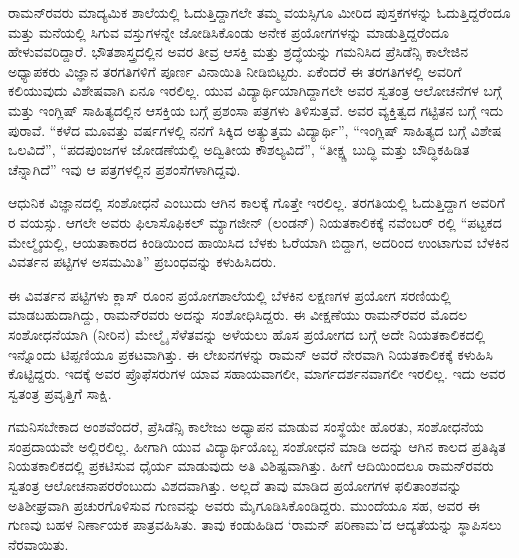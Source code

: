ರಾಮನ್‍ರವರು ಮಾದ್ಯಮಿಕ ಶಾಲೆಯಲ್ಲಿ ಓದುತ್ತಿದ್ದಾಗಲೇ ತಮ್ಮ ವಯಸ್ಸಿಗೂ ಮೀರಿದ ಪುಸ್ತಕಗಳನ್ನು ಓದುತ್ತಿದ್ದರೆಂದೂ ಮತ್ತು ಮನೆಯಲ್ಲಿ ಸಿಗುವ ವಸ್ತುಗಳನ್ನೇ ಜೋಡಿಸಿಕೊಂಡು ಅನೇಕ ಪ್ರಯೋಗಗಳನ್ನು ಮಾಡುತ್ತಿದ್ದರೆಂದೂ ಹೇಳುವವರಿದ್ದಾರೆ. ಭೌತಶಾಸ್ತ್ರದಲ್ಲಿನ ಅವರ ತೀವ್ರ ಆಸಕ್ತಿ ಮತ್ತು ಶ್ರದ್ಧೆಯನ್ನು ಗಮನಿಸಿದ ಪ್ರೆಸಿಡೆನ್ಸಿ ಕಾಲೇಜಿನ ಅಧ್ಯಾಪಕರು ವಿಜ್ಞಾನ ತರಗತಿಗಳಿಗೆ ಪೂರ್ಣ ವಿನಾಯಿತಿ ನೀಡಿಬಿಟ್ಟರು. ಏಕೆಂದರೆ ಈ ತರಗತಿಗಳಲ್ಲಿ ಅವರಿಗೆ ಕಲಿಯುವುದು ವಿಶೇಷವಾಗಿ ಏನೂ ಇರಲಿಲ್ಲ. ಯುವ ವಿದ್ಯಾರ್ಥಿಯಾಗಿದ್ದಾಗಲೇ ಅವರ ಸ್ವತಂತ್ರ ಆಲೋಚನೆಗಳ ಬಗ್ಗೆ ಮತ್ತು ಇಂಗ್ಲಿಷ್ ಸಾಹಿತ್ಯದಲ್ಲಿನ ಆಸಕ್ತಿಯ ಬಗ್ಗೆ ಪ್ರಶಂಸಾ ಪತ್ರಗಳು ತಿಳಿಸುತ್ತವೆ. ಅವರ ವ್ಯಕ್ತಿತ್ವದ ಗಟ್ಟಿತನ ಬಗ್ಗೆ ಇದು ಪುರಾವೆ. “ಕಳೆದ ಮೂವತ್ತು ವರ್ಷಗಳಲ್ಲಿ ನನಗೆ ಸಿಕ್ಕಿದ ಅತ್ಯುತ್ತಮ ವಿದ್ಯಾರ್ಥಿ”, “ಇಂಗ್ಲಿಷ್ ಸಾಹಿತ್ಯದ ಬಗ್ಗೆ ವಿಶೇಷ ಒಲವಿದೆ”, “ಪದಪುಂಜಗಳ ಜೋಡಣೆಯಲ್ಲಿ ಅದ್ವಿತೀಯ ಕೌಶಲ್ಯವಿದೆ”, “ತೀಕ್ಷ್ಣ ಬುದ್ಧಿ ಮತ್ತು ಬೌದ್ಧಿಕಹಿಡಿತ ಚೆನ್ನಾಗಿದೆ”  ಇವು ಆ ಪತ್ರಗಳಲ್ಲಿನ ಪ್ರಶಂಸೆಗಳಾಗಿದ್ದವು.

ಆಧುನಿಕ ವಿಜ್ಞಾನದಲ್ಲಿ ಸಂಶೋಧನೆ ಎಂಬುದು ಆಗಿನ ಕಾಲಕ್ಕೆ ಗೊತ್ತೇ ಇರಲಿಲ್ಲ.  ತರಗತಿಯಲ್ಲಿ ಓದುತ್ತಿದ್ದಾಗ ಅವರಿಗೆ ರ ವಯಸ್ಸು. ಆಗಲೇ ಅವರು ಫಿಲಾಸೊಫಿಕಲ್ ಮ್ಯಾಗಜೀನ್ (ಲಂಡನ್) ನಿಯತಕಾಲಿಕಕ್ಕೆ ನವೆಂಬರ್ ರಲ್ಲಿ “ಪಟ್ಟಕದ ಮೇಲ್ಮೈಯಲ್ಲಿ, ಆಯತಾಕಾರದ ಕಿಂಡಿಯಿಂದ ಹಾಯಿಸಿದ ಬೆಳಕು ಓರೆಯಾಗಿ ಬಿದ್ದಾಗ, ಅದರಿಂದ ಉಂಟಾಗುವ ಬೆಳಕಿನ ವಿವರ್ತನ ಪಟ್ಟಿಗಳ ಅಸಮಮಿತಿ”  ಪ್ರಬಂಧವನ್ನು ಕಳುಹಿಸಿದರು.

ಈ ವಿವರ್ತನ ಪಟ್ಟಿಗಳು ಕ್ಲಾಸ್ ರೂಂನ ಪ್ರಯೋಗಶಾಲೆಯಲ್ಲಿ ಬೆಳಕಿನ ಲಕ್ಷಣಗಳ ಪ್ರಯೋಗ ಸರಣಿಯಲ್ಲಿ ಮಾಡಬಹುದಾಗಿದ್ದು, ರಾಮನ್‍ರವರು ಅದನ್ನು ಸಂಶೋಧಿಸಿದ್ದರು. ಈ ವೀಕ್ಷಣೆಯು ರಾಮನ್‍ರವರ ಮೊದಲ ಸಂಶೋಧನೆಯಾಗಿ (ನೀರಿನ) ಮೇಲ್ಮೈ ಸೆಳೆತವನ್ನು ಅಳೆಯಲು ಹೊಸ ಪ್ರಯೋಗದ ಬಗ್ಗೆ ಅದೇ ನಿಯತಕಾಲಿಕದಲ್ಲಿ ಇನ್ನೊಂದು ಟಿಪ್ಪಣಿಯೂ ಪ್ರಕಟವಾಗಿತ್ತು. ಈ ಲೇಖನಗಳನ್ನು ರಾಮನ್ ಅವರೆ ನೇರವಾಗಿ ನಿಯತಕಾಲಿಕಕ್ಕೆ ಕಳುಹಿಸಿ ಕೊಟ್ಟಿದ್ದರು. ಇದಕ್ಕೆ ಅವರ ಪ್ರೊಫೆಸರುಗಳ ಯಾವ ಸಹಾಯವಾಗಲೀ, ಮಾರ್ಗದರ್ಶನವಾಗಲೀ ಇರಲಿಲ್ಲ. ಇದು ಅವರ ಸ್ವತಂತ್ರ ಪ್ರವೃತ್ತಿಗೆ ಸಾಕ್ಷಿ.

ಗಮನಿಸಬೇಕಾದ ಅಂಶವೆಂದರೆ, ಪ್ರೆಸಿಡೆನ್ಸಿ ಕಾಲೇಜು ಅಧ್ಯಾಪನ ಮಾಡುವ ಸಂಸ್ಥೆಯೇ ಹೊರತು, ಸಂಶೋಧನೆಯ ಸಂಪ್ರದಾಯವೇ ಅಲ್ಲಿರಲಿಲ್ಲ. ಹೀಗಾಗಿ ಯುವ ವಿದ್ಯಾರ್ಥಿಯೊಬ್ಬ ಸಂಶೋಧನೆ ಮಾಡಿ ಅದನ್ನು ಆಗಿನ ಕಾಲದ ಪ್ರತಿಷ್ಠಿತ ನಿಯತಕಾಲಿಕದಲ್ಲಿ ಪ್ರಕಟಿಸುವ ಧೈರ್ಯ ಮಾಡುವುದು ಅತಿ ವಿಶಿಷ್ಟವಾಗಿತ್ತು. ಹೀಗೆ ಆದಿಯಿಂದಲೂ ರಾಮನ್‍ರವರು ಸ್ವತಂತ್ರ ಆಲೋಚನಾಪರರೆಂಬುದು ವಿಶದವಾಗಿತ್ತು. ಅಲ್ಲದೆ ತಾವು ಮಾಡಿದ ಪ್ರಯೋಗಗಳ ಫಲಿತಾಂಶವನ್ನು ಅತಿಶೀಘ್ರವಾಗಿ ಪ್ರಚುರಗೊಳಿಸುವ ಗುಣವನ್ನು ಅವರು ಮೈಗೂಡಿಸಿಕೊಂಡಿದ್ದರು. ಮುಂದೆಯೂ ಸಹ, ಅವರ ಈ ಗುಣವು ಬಹಳ ನಿರ್ಣಾಯಕ ಪಾತ್ರವಹಿಸಿತು. ತಾವು ಕಂಡುಹಿಡಿದ ‘ರಾಮನ್ ಪರಿಣಾಮ’ದ ಆದ್ಯತೆಯನ್ನು ಸ್ಥಾಪಿಸಲು ನೆರವಾಯಿತು.

